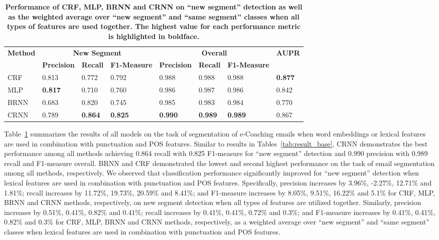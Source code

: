 \documentclass{amia}
\begin{document}
\begin{table}[ht]
\centering
\caption{\textbf{Performance of CRF, MLP, BRNN and CRNN on ``new segment'' detection as well as the weighted average over ``new segment'' and ``same segment'' classes when all types of features are used together. The highest value for each performance metric is highlighted in boldface.}}
\label{tab:result_weighted_avg}
 \begin{tabular}{|l|l|l|l|l|l|l|l|}
  \hline
   \multirow{2}{*}{\textbf{Method}} & \multicolumn{3}{|c|}{\textbf{New Segment}} & \multicolumn{3}{|c|}{\textbf{Overall}} & \multirow{2}{*}{\textbf{AUPR}} \\\cline{2-7}
   & \textbf{Precision}  & \textbf{Recall} & \textbf{F1-Measure} & \textbf{Precision}  & \textbf{Recall} & \textbf{F1-Measure} & \\ \hline    
 CRF & 0.813 & 0.772 & 0.792 & 0.988 & 0.988 & 0.988 & \textbf{0.877} \\ \hline
 MLP & \textbf{0.817} & 0.710 & 0.760 & 0.986 & 0.987 & 0.986 & 0.842 \\ \hline
 BRNN & 0.683 & 0.820 & 0.745 & 0.985 & 0.983 & 0.984 & 0.770 \\ \hline
 CRNN & 0.789 & \textbf{0.864} & \textbf{0.825} & \textbf{0.990} & \textbf{0.989} & \textbf{0.989} & 0.867 \\ \hline
  \end{tabular}
\end{table}       

Table~\ref{tab:result_weighted_avg} summarizes the results of all models on the task of segmentation of e-Coaching emails when word embeddings or lexical features are used in combination with punctuation and POS features. Similar to results in Tables~\ref{tab:result_base}, CRNN demonstrates the best performance among all methods achieving 0.864 recall with 0.825 F1-measure for ``new segment'' detection and 0.990 precision with 0.989 recall and F1-measure overall. BRNN and CRF demonstrated the lowest and second highest performance on the task of email segmentation among all methods, respectively. We observed that classification performance significantly improved for ``new segment'' detection when lexical features are used in combination with punctuation and POS features. Specifically, precision increases by 3.96\%, -2.27\%, 12.71\% and 1.81\%; recall increases by 11.72\%, 19.73\%, 20.59\% and 8.41\%; and F1-measure increases by 8.05\%, 9.51\%, 16.22\% and 5.1\% for CRF, MLP, BRNN and CRNN methods, respectively, on new segment detection when all types of features are utilized together. Similarly, precision increases by 0.51\%, 0.41\%, 0.82\% and 0.41\%; recall increases by 0.41\%, 0.41\%, 0.72\% and 0.3\%; and F1-measure increases by 0.41\%, 0.41\%, 0.82\% and 0.3\% for CRF, MLP, BRNN and CRNN methods, respectively, as a weighted average over ``new segment'' and ``same segment'' classes when lexical features are used in combination with punctuation and POS features.
\end{document}
